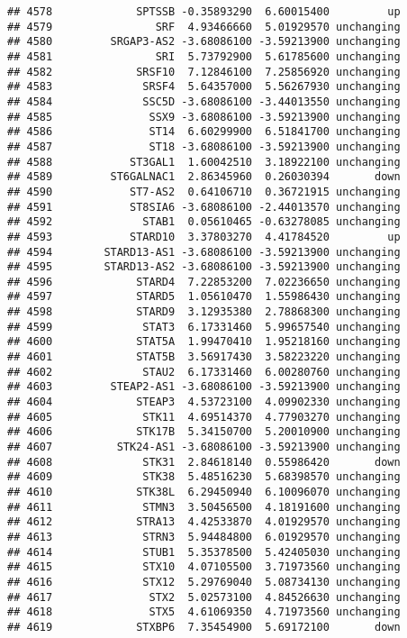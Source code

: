 \documentclass[]{article}
\begin{document}
\begin{verbatim}
## 4578             SPTSSB -0.35893290  6.60015400         up
## 4579                SRF  4.93466660  5.01929570 unchanging
## 4580         SRGAP3-AS2 -3.68086100 -3.59213900 unchanging
## 4581                SRI  5.73792900  5.61785600 unchanging
## 4582             SRSF10  7.12846100  7.25856920 unchanging
## 4583              SRSF4  5.64357000  5.56267930 unchanging
## 4584              SSC5D -3.68086100 -3.44013550 unchanging
## 4585               SSX9 -3.68086100 -3.59213900 unchanging
## 4586               ST14  6.60299900  6.51841700 unchanging
## 4587               ST18 -3.68086100 -3.59213900 unchanging
## 4588            ST3GAL1  1.60042510  3.18922100 unchanging
## 4589         ST6GALNAC1  2.86345960  0.26030394       down
## 4590            ST7-AS2  0.64106710  0.36721915 unchanging
## 4591            ST8SIA6 -3.68086100 -2.44013570 unchanging
## 4592              STAB1  0.05610465 -0.63278085 unchanging
## 4593            STARD10  3.37803270  4.41784520         up
## 4594        STARD13-AS1 -3.68086100 -3.59213900 unchanging
## 4595        STARD13-AS2 -3.68086100 -3.59213900 unchanging
## 4596             STARD4  7.22853200  7.02236650 unchanging
## 4597             STARD5  1.05610470  1.55986430 unchanging
## 4598             STARD9  3.12935380  2.78868300 unchanging
## 4599              STAT3  6.17331460  5.99657540 unchanging
## 4600             STAT5A  1.99470410  1.95218160 unchanging
## 4601             STAT5B  3.56917430  3.58223220 unchanging
## 4602              STAU2  6.17331460  6.00280760 unchanging
## 4603         STEAP2-AS1 -3.68086100 -3.59213900 unchanging
## 4604             STEAP3  4.53723100  4.09902330 unchanging
## 4605              STK11  4.69514370  4.77903270 unchanging
## 4606             STK17B  5.34150700  5.20010900 unchanging
## 4607          STK24-AS1 -3.68086100 -3.59213900 unchanging
## 4608              STK31  2.84618140  0.55986420       down
## 4609              STK38  5.48516230  5.68398570 unchanging
## 4610             STK38L  6.29450940  6.10096070 unchanging
## 4611              STMN3  3.50456500  4.18191600 unchanging
## 4612             STRA13  4.42533870  4.01929570 unchanging
## 4613              STRN3  5.94484800  6.01929570 unchanging
## 4614              STUB1  5.35378500  5.42405030 unchanging
## 4615              STX10  4.07105500  3.71973560 unchanging
## 4616              STX12  5.29769040  5.08734130 unchanging
## 4617               STX2  5.02573100  4.84526630 unchanging
## 4618               STX5  4.61069350  4.71973560 unchanging
## 4619             STXBP6  7.35454900  5.69172100       down

\end{verbatim}
\end{document}
